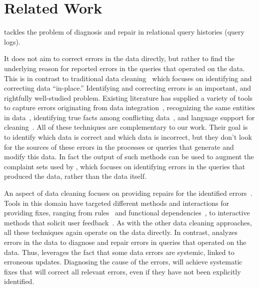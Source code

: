
\section{Related Work}
\label{s:related} 
\sys tackles the problem of diagnosis and repair in relational query
histories (query logs). 


It does not aim to correct errors in the data
directly, but rather to find the underlying reason for reported errors
in the queries that operated on the data. 
This is in contrast to
traditional data 
cleaning~\cite{dallachiesa2013nadeef, rahm00, Raman01, Kalashnikov06, Fan2008b
} which focuses on identifying and correcting data
``in-place.'' Identifying and correcting errors is an important, and
rightfully well-studied problem. Existing literature has supplied a
variety of tools to capture errors originating from data
integration~\cite{Abiteboul99
},
recognizing the same entities in data~\cite{Koudas2006, GruenheidDS14
}, identifying true facts among conflicting
data~\cite{yin2008truth, DN09, ltm2012
}, and language support for
cleaning~\cite{Galhardas2000}. All of these techniques are
complementary to our work. Their goal is to identify which data is
correct and which data is incorrect, but they don't look for the
sources of these errors in the processes or queries that generate and
modify this data. In fact the output of such methods can be used to
augment the complaint sets used by \sys, which focuses on identifying
errors in the queries that produced the data, rather than the data
itself.

An aspect of data cleaning focuses on providing repairs for the
identified errors~\cite{ChuIP13}. Tools in this domain have targeted
different methods and interactions for providing fixes, ranging from
rules~\cite{Beskales2010, Cong2007
} and functional
dependencies~\cite{Fan2008b, ChuIP13
}, to interactive methods that
solicit user feedback~\cite{Yakout, Raman01
}. As with the other data
cleaning approaches, all these techniques again operate on the data
directly. In contrast, \sys analyzes errors in the data to diagnose
and repair errors in queries that operated on the data. Thus, \sys
leverages the fact that some data errors are systemic, linked to
erroneous updates. Diagnosing the cause of the errors, will achieve
systematic fixes that will correct all relevant errors, even if they
have not been explicitly identified.

